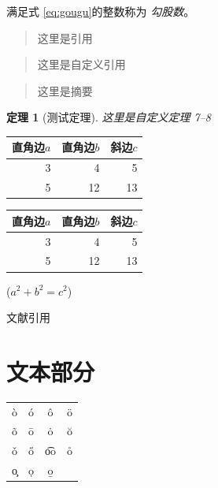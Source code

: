 \documentclass[UTF8]{ctexart}
\newtheorem{thm}{定理}
\newenvironment{myquote}
  {\begin{quote} \kaishu \zihao{-5}}
  {\end{quote}}
\begin{document}
满足式 \eqref{eq:gougu}的整数称为 \emph{勾股数}。

\begin{quote}
   \kaishu 这里是引用
\end{quote}

\begin{myquote}
  这里是自定义引用
\end{myquote}

\begin{abstract}
  这里是摘要
\end{abstract}

\begin{thm}[测试定理]
  这里是自定义定理
    7--8
\end{thm}

\begin{tabular}{|rrr|}
\hline
    直角边$a$ & 直角边$b$ & 斜边$c$ \\
\hline
    3 &  4 &  5 \\
    5 &  12 & 13 \\
\hline
\end{tabular}

\begin{table}[H]
  \begin{tabular}{|rrr|}
    \hline
        直角边$a$ & 直角边$b$ & 斜边$c$ \\
    \hline
        3 &  4 &  5 \\
        5 &  12 & 13 \\
    \hline
  \end{tabular}
  \qquad ($a^2 + b^2 = c^2$)
\end{table}

文献引用 \cite{Kline}

\nocite{Shiye}


\section{文本部分}
\begin{table}[H]
\begin{tabular}{cccc}
\hline
\`o & \'o & \^o & \"o \\
\~o & \=o & \.o & \u{o} \\
\v{o} & \H{o} & \t{oo} & \r{o} \\
\c{o} & \d{o} & \b{o} & \\
\hline
\end{tabular}
\end{table}
\end{document}
